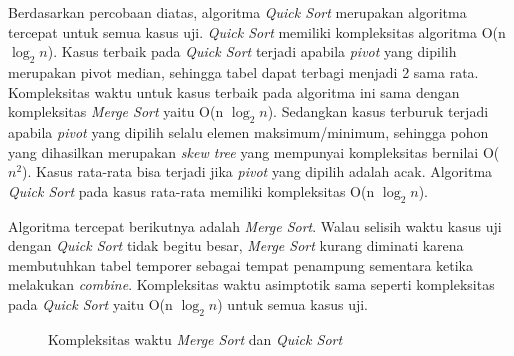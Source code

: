 \documentclass{article}
\begin{document}
	\clearpage
	\par Berdasarkan percobaan diatas, algoritma \textit{Quick Sort} merupakan algoritma tercepat untuk semua kasus uji. \textit{Quick Sort} memiliki kompleksitas algoritma O(n $\log_2 n$). Kasus terbaik pada \textit{Quick Sort} terjadi apabila \textit{pivot} yang dipilih merupakan pivot median, sehingga tabel dapat terbagi menjadi 2 sama rata. Kompleksitas waktu untuk kasus terbaik pada algoritma ini sama dengan kompleksitas \textit{Merge Sort} yaitu O(n $\log_2 n$). Sedangkan kasus terburuk terjadi apabila \textit{pivot} yang dipilih selalu elemen maksimum/minimum, sehingga pohon yang dihasilkan merupakan \textit{skew tree} yang mempunyai kompleksitas bernilai O($n^2$). Kasus rata-rata bisa terjadi jika \textit{pivot} yang dipilih adalah acak. Algoritma \textit{Quick Sort}  pada kasus rata-rata memiliki kompleksitas O(n $\log_2 n$).
	\par Algoritma tercepat berikutnya adalah \textit{Merge Sort}. Walau selisih waktu kasus uji dengan \textit{Quick Sort} tidak begitu besar, \textit{Merge Sort} kurang diminati karena membutuhkan tabel temporer sebagai tempat penampung sementara ketika melakukan \textit{combine}. Kompleksitas waktu asimptotik sama seperti kompleksitas pada \textit{Quick Sort} yaitu O(n $\log_2 n$) untuk semua kasus uji.
	
	\begin{figure}[h]
	\vspace*{-0.2in}
		\caption{Kompleksitas waktu \textit{Merge Sort} dan \textit{Quick Sort}}
	\end{figure}	
	
\end{document}

